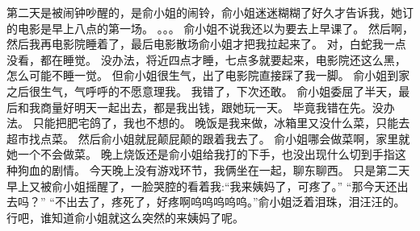 第二天是被闹钟吵醒的，是俞小姐的闹铃，俞小姐迷迷糊糊了好久才告诉我，她订的电影是早上八点的第一场。
。。。
俞小姐不说我还以为要去上早课了。
然后啊，然后我再电影院睡着了，最后电影散场俞小姐才把我拉起来了。
对，白蛇我一点没看，都在睡觉。
没办法，将近四点才睡，七点多就要起来，电影院还这么黑，怎么可能不睡一觉。
但俞小姐很生气，出了电影院直接踩了我一脚。
俞小姐到家之后很生气，气呼呼的不愿意理我。
我错了，下次还敢。
俞小姐委屈了半天，最后和我商量好明天一起出去，都是我出钱，跟她玩一天。
毕竟我错在先。没办法。
只能把肥宅鸽了，我也不想的。
晚饭是我来做，冰箱里又没什么菜，只能去超市找点菜。
然后俞小姐就屁颠屁颠的跟着我去了。
俞小姐哪会做菜啊，家里就她一个不会做菜。
晚上烧饭还是俞小姐给我打的下手，也没出现什么切到手指这种狗血的剧情。
今天晚上没有游戏环节，我俩坐在一起，聊东聊西。
只是第二天早上又被俞小姐摇醒了，一脸哭腔的看着我:“我来姨妈了，可疼了。”
“那今天还出去吗？”
“不出去了，疼死了，好疼啊呜呜呜呜呜。”俞小姐泛着泪珠，泪汪汪的。
行吧，谁知道俞小姐就这么突然的来姨妈了呢。

